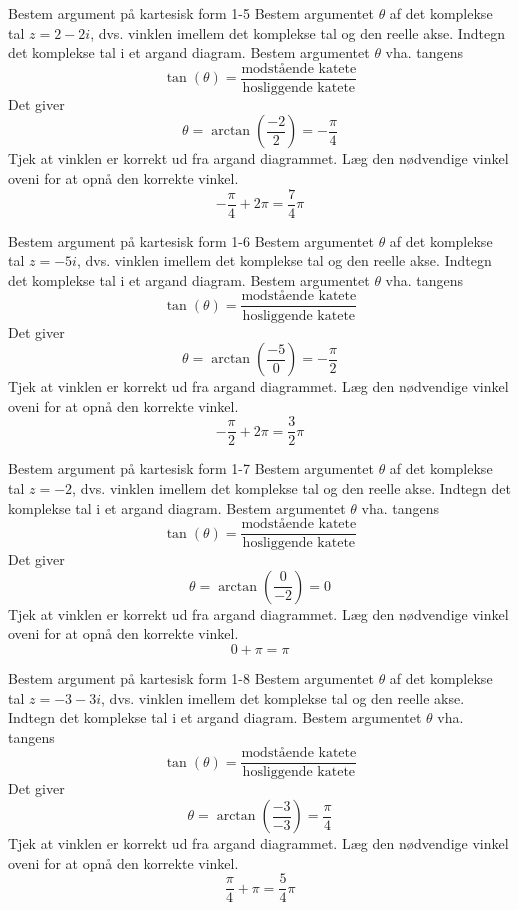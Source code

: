 \documentclass{article}
\begin{document}
\newpage
\begin{exercise}{Bestem argument på kartesisk form 1-5}
Bestem argumentet $\theta$ af det komplekse tal $z = 2 - 2i$, dvs. vinklen imellem det komplekse tal og den reelle akse.
\hint
Indtegn det komplekse tal i et argand diagram.
\hint
Bestem argumentet $\theta$ vha. tangens
\[\tan(\theta) = \frac{\textrm{modstående katete}}{\textrm{hosliggende katete}}
\]
\hint
Det giver
\[\theta = \arctan \left(\frac{ - 2}{2}\right) = - \frac{\pi}{4}
\]
\hint
Tjek at vinklen er korrekt ud fra argand diagrammet. Læg den nødvendige vinkel oveni for at opnå den korrekte vinkel.
\[ - \frac{\pi}{4} + 2 \pi = \frac{7}{4} \pi
\]
\end{exercise}
\newpage
\begin{exercise}{Bestem argument på kartesisk form 1-6}
Bestem argumentet $\theta$ af det komplekse tal $z = - 5i$, dvs. vinklen imellem det komplekse tal og den reelle akse.
\hint
Indtegn det komplekse tal i et argand diagram.
\hint
Bestem argumentet $\theta$ vha. tangens
\[\tan(\theta) = \frac{\textrm{modstående katete}}{\textrm{hosliggende katete}}
\]
\hint
Det giver
\[\theta = \arctan \left(\frac{ - 5}{0}\right) = - \frac{\pi}{2}
\]
\hint
Tjek at vinklen er korrekt ud fra argand diagrammet. Læg den nødvendige vinkel oveni for at opnå den korrekte vinkel.
\[ - \frac{\pi}{2} + 2 \pi = \frac{3}{2} \pi
\]
\end{exercise}
\newpage
\begin{exercise}{Bestem argument på kartesisk form 1-7}
Bestem argumentet $\theta$ af det komplekse tal $z = - 2$, dvs. vinklen imellem det komplekse tal og den reelle akse.
\answerbox{\pi}
\hint
Indtegn det komplekse tal i et argand diagram.
\hint
Bestem argumentet $\theta$ vha. tangens
\[\tan(\theta) = \frac{\textrm{modstående katete}}{\textrm{hosliggende katete}}
\]
\hint
Det giver
\[\theta = \arctan \left(\frac{0}{ - 2}\right) = 0
\]
\hint
Tjek at vinklen er korrekt ud fra argand diagrammet. Læg den nødvendige vinkel oveni for at opnå den korrekte vinkel.
\[0 + \pi = \pi
\]
\end{exercise}
\newpage
\begin{exercise}{Bestem argument på kartesisk form 1-8}
Bestem argumentet $\theta$ af det komplekse tal $z = - 3 - 3i$, dvs. vinklen imellem det komplekse tal og den reelle akse.
\hint
Indtegn det komplekse tal i et argand diagram.
\hint
Bestem argumentet $\theta$ vha. tangens
\[\tan(\theta) = \frac{\textrm{modstående katete}}{\textrm{hosliggende katete}}
\]
\hint
Det giver
\[\theta = \arctan \left(\frac{ - 3}{ - 3}\right) = \frac{\pi}{4}
\]
\hint
Tjek at vinklen er korrekt ud fra argand diagrammet. Læg den nødvendige vinkel oveni for at opnå den korrekte vinkel.
\[\frac{\pi}{4} + \pi = \frac{5}{4} \pi
\]
\end{exercise}
\end{document}

